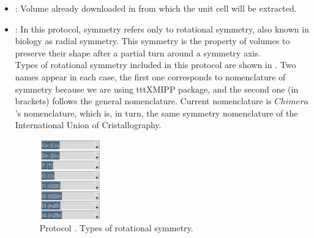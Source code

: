 \begin{itemize}
  \begin{itemize}
  \item {}: Volume already downloaded in \scipion from which the unit cell will be extracted.\\
  \item {}: In this protocol, symmetry refers only to rotational symmetry, also known in biology as radial symmetry. This symmetry is the property of volumes to preserve their shape after a partial turn around a symmetry axis.  \\
  Types of rotational symmetry included in this protocol are shown in . Two names appear in each case, the first one corresponds to  nomenclature of symmetry because we are using ttt{XMIPP} package, and the second one (in brackets) follows the general \scipion nomenclature. Current \scipion nomenclature is $Chimera$'s nomenclature, which is, in turn, the same symmetry nomenclature of the International Union of Cristallography. \\
  
    \begin{figure}[H]
    \centering 
    \captionsetup{width=.7\linewidth} 
    \includegraphics[width=0.25\textwidth]{Images_appendix/Fig108.pdf}
    \caption{Protocol . Types of rotational symmetry.}
    \label{fig:app_protocol_extractUnitCell_2}
   \end{figure}
   

\end{itemize}
\end{itemize}

